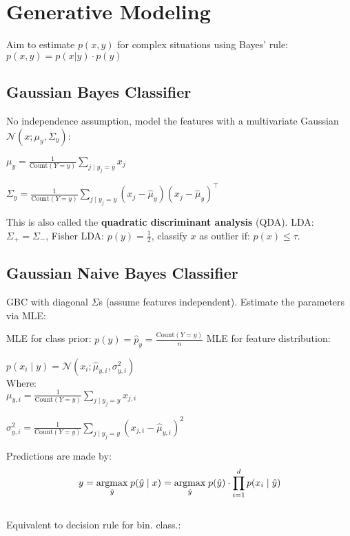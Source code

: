 \section*{Generative Modeling}

Aim to estimate $p(x, y)$ for complex situations using Bayes' rule: $p(x,y) = p(x|y) \cdot p(y)$

\subsection*{Gaussian Bayes Classifier}

No independence assumption, model the features with a multivariate Gaussian $\mathcal{N}(x; \mu_y, \Sigma_y)$:

\quad $\mu_{y} = \frac{1}{\text{Count}(Y = y)} \sum_{j \; | \; y_j = y} x_{j}$

\quad $\Sigma_{y} = \frac{1}{\text{Count}(Y = y)} \sum_{j \; | \; y_j = y} (x_{j} - \hat \mu_{y}) (x_{j} - \hat \mu_{y})^\top$

This is also called the \textbf{quadratic discriminant analysis} (QDA). LDA: $\Sigma_+ = \Sigma_-$, Fisher LDA: $p(y) = \frac{1}{2}$, classify $x$ as outlier if: $p(x) \leq \tau$.

\subsection*{Gaussian Naive Bayes Classifier}

GBC with diagonal $\Sigma$s (assume features independent). Estimate the parameters via MLE:

MLE for class prior: $p(y) = \hat p_y = \frac{\text{Count}(Y = y)}{n}$
MLE for feature distribution:

\qquad \qquad $p(x_i \; | \; y) = \mathcal{N}(x_i; \hat \mu_{y,i}, \sigma^2_{y,i})$ \\[-10pt]

Where:\\[-12pt]

\qquad \quad $\mu_{y,i} = \frac{1}{\text{Count}(Y = y)} \sum_{j \; | \; y_j = y} x_{j,i}$

\qquad \quad $\sigma^2_{y,i} = \frac{1}{\text{Count}(Y = y)} \sum_{j \; | \; y_j = y} (x_{j,i} - \hat \mu_{y, i})^2$


Predictions are made by: \\[-20pt]
$$y = \underset{\hat y}{\text{argmax}} \; p(\hat y \; | \; x) = \underset{\hat y}{\text{argmax}} \; p(\hat y) \cdot \prod_{i=1}^d p(x_i \; | \; \hat y)$$\\[-10pt]
Equivalent to decision rule for bin. class.: \\[-8pt]

